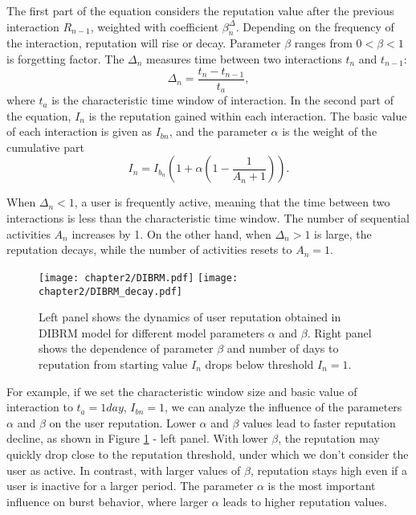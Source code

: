 The first part of the equation considers the reputation value after the previous interaction $R_{n-1}$, weighted with coefficient $\beta^\Delta_{n}$. Depending on the frequency of the interaction, reputation will rise or decay. Parameter $\beta$ ranges from $0<\beta < 1$ is forgetting factor. The $\Delta_n$ measures time between two interactions $t_n$ and $t_{n-1}$: 
\begin{equation}\label{eq:deltan}
\Delta_{n}=\frac{t_{n}-t_{n-1}}{t_{a}},
\end{equation}
where $t_a$ is the characteristic time window of interaction. In the second part of the equation, $I_n$ is the reputation gained within each interaction. The basic value of each interaction is given as $I_{bn}$, and the parameter $\alpha$ is the weight of the cumulative part 
\begin{equation}\label{eq:ibn}
I_n  = I_{b_{n}}(1 +  \alpha  (1-\frac{1}{A_n+1})).
\end{equation}

When $\Delta_{n}<1$, a user is frequently active, meaning that the time between two interactions is less than the characteristic time window. The number of sequential activities $A_n$ increases by 1. On the other hand, when $\Delta_n>1$ is large, the reputation decays, while the number of activities resets to $A_n=1$. 

\begin{figure}[h]
	\centering
	\texttt{[image: chapter2/DIBRM.pdf]}
	\texttt{[image: chapter2/DIBRM\_decay.pdf]}
	\caption[User reputations.]{Left panel shows the dynamics of user reputation obtained in DIBRM model for different model parameters $\alpha$ and $\beta$. Right panel shows the dependence of parameter $\beta$ and number of days to reputation from starting value $I_n$ drops below threshold $I_n=1$.}
	\label{fig:reputation}
\end{figure}  

For example, if we set the characteristic window size and basic value of interaction to $t_a=1 day$, $I_{bn}=1$, we can analyze the influence of the parameters $\alpha$ and $\beta$ on the user reputation. Lower $\alpha$ and $\beta$ values lead to faster reputation decline, as shown in Figure \ref{fig:reputation} - left panel. With lower $\beta$, the reputation may quickly drop close to the reputation threshold, under which we don't consider the user as active. In contrast, with larger values of $\beta$, reputation stays high even if a user is inactive for a larger period. The parameter $\alpha$ is the most important influence on burst behavior, where larger $\alpha$ leads to higher reputation values. 

